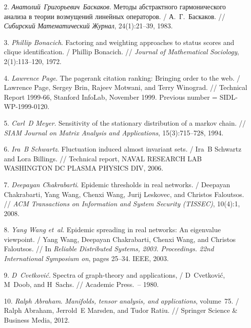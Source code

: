 \documentclass[12pt]{article}
\theoremstyle{definition}
\begin{document}
2.
\emph{Анатолий~Григорьевич~Баскаков}.
Методы абстрактного гармонического анализа в теории возмущений
линейных операторов.
/ А.~Г.~Баскаков.
// {\em Сибирский Математический Журнал}, 24(1):21--39, 1983.

3.
\emph{Phillip Bonacich}.
Factoring and weighting approaches to status scores and clique
identification.
/ Phillip Bonacich.
// {\em Journal of Mathematical Sociology}, 2(1):113--120, 1972.

4.
\emph{Lawrence Page}.
The pagerank citation ranking: Bringing order to the web.
/  Lawrence Page, Sergey Brin, Rajeev Motwani, and Terry Winograd.
// Technical Report 1999-66, Stanford InfoLab, November 1999.
   Previous number = SIDL-WP-1999-0120.

5.
\emph{Carl~D Meyer.}
Sensitivity of the stationary distribution of a markov chain.
// {\em SIAM Journal on Matrix Analysis and Applications},
  15(3):715--728, 1994.

6.
\emph{Ira~B Schwartz}.
Fluctuation induced almost invariant sets.
/ Ira~B Schwartz and Lora Billings.
// Technical report, NAVAL RESEARCH LAB WASHINGTON DC PLASMA PHYSICS
  DIV, 2006.

7.
\emph{Deepayan Chakrabarti}.
Epidemic thresholds in real networks.
/ Deepayan Chakrabarti, Yang Wang, Chenxi Wang, Jurij Leskovec, and Christos
  Faloutsos.
// {\em ACM Transactions on Information and System Security (TISSEC)},
  10(4):1, 2008.

8.
\emph{Yang Wang et~al.}
Epidemic spreading in real networks: An eigenvalue viewpoint.
/ Yang Wang, Deepayan Chakrabarti, Chenxi Wang, and Christos Faloutsos.
// In {\em Reliable Distributed Systems, 2003. Proceedings. 22nd
  International Symposium on}, pages 25--34. IEEE, 2003.

9.
\emph{D~Cvetkovi{\'c}.}
Spectra of graph-theory and applications,
/ D~Cvetkovi{\'c}, M~Doob, and H~Sachs.
// Academic Press.~-- 1980.

10.
\emph{Ralph Abraham}.
{\em Manifolds, tensor analysis, and applications}, volume~75.
/ Ralph Abraham, Jerrold~E Marsden, and Tudor Ratiu.
// Springer Science \& Business Media, 2012.
\end{document}
